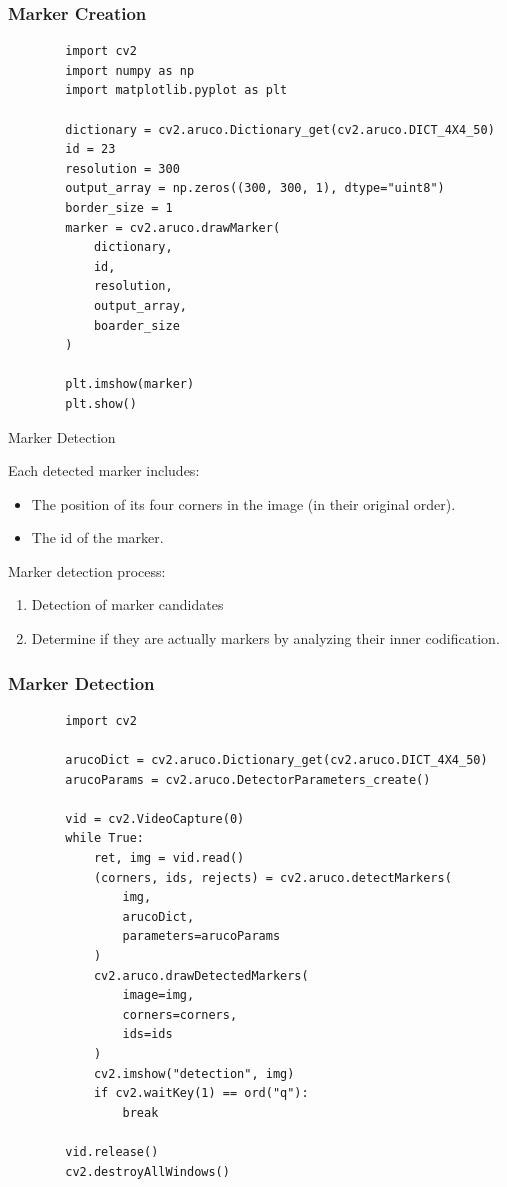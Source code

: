 \documentclass[12pt,letterpaper]{beamer}
\begin{document}
\begin{frame}[fragile]
    \frametitle{Marker Creation}

    {\scriptsize
    \begin{verbatim}
        import cv2
        import numpy as np
        import matplotlib.pyplot as plt

        dictionary = cv2.aruco.Dictionary_get(cv2.aruco.DICT_4X4_50)
        id = 23
        resolution = 300
        output_array = np.zeros((300, 300, 1), dtype="uint8")
        border_size = 1
        marker = cv2.aruco.drawMarker(
            dictionary, 
            id, 
            resolution, 
            output_array, 
            boarder_size
        )
        
        plt.imshow(marker)
        plt.show()
    \end{verbatim}
}
\end{frame}

\begin{frame}{Marker Detection}

    Each detected marker includes:
    {\scriptsize
        \begin{itemize}
            \item The position of its four corners in the image (in their original order).
            \item The id of the marker.
        \end{itemize}
    }
    Marker detection process:
    {\scriptsize
        \begin{enumerate}
            \item Detection of marker candidates
            \item Determine if they are actually markers by analyzing their inner codification.
        \end{enumerate}
    }
\end{frame}

\begin{frame}[fragile]
    \frametitle{Marker Detection}
    \scriptsize
    \begin{verbatim}
        import cv2

        arucoDict = cv2.aruco.Dictionary_get(cv2.aruco.DICT_4X4_50)
        arucoParams = cv2.aruco.DetectorParameters_create()

        vid = cv2.VideoCapture(0)
        while True:
            ret, img = vid.read()
            (corners, ids, rejects) = cv2.aruco.detectMarkers(
                img,
                arucoDict,
                parameters=arucoParams
            )
            cv2.aruco.drawDetectedMarkers(
                image=img,
                corners=corners,
                ids=ids
            )
            cv2.imshow("detection", img)
            if cv2.waitKey(1) == ord("q"):
                break

        vid.release()
        cv2.destroyAllWindows()
    \end{verbatim}
\end{frame}
\end{document}
